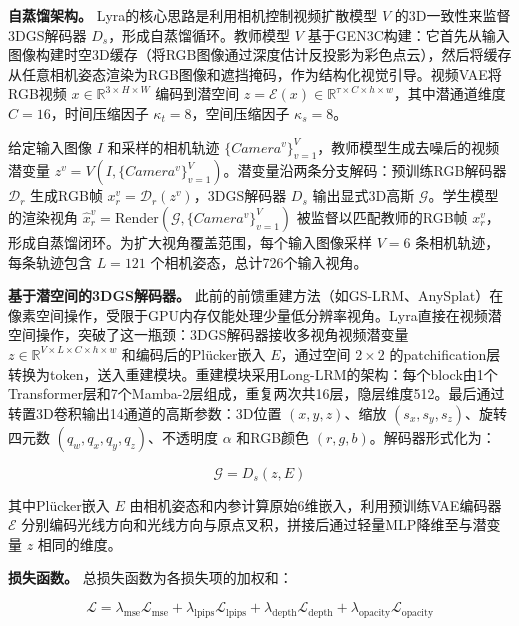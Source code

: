 \textbf{自蒸馏架构。}
Lyra的核心思路是利用相机控制视频扩散模型 $V$ 的3D一致性来监督3DGS解码器 $D_s$，形成自蒸馏循环。教师模型 $V$ 基于GEN3C构建：它首先从输入图像构建时空3D缓存（将RGB图像通过深度估计反投影为彩色点云），然后将缓存从任意相机姿态渲染为RGB图像和遮挡掩码，作为结构化视觉引导。视频VAE将RGB视频 $x \in \mathbb{R}^{3 \times H \times W}$ 编码到潜空间 $z = \mathcal{E}(x) \in \mathbb{R}^{\tau \times C \times h \times w}$，其中潜通道维度 $C=16$，时间压缩因子 $\kappa_t=8$，空间压缩因子 $\kappa_s=8$。

给定输入图像 $I$ 和采样的相机轨迹 $\{Camera^{v}\}_{v=1}^{V}$，教师模型生成去噪后的视频潜变量 $z^v = V(I, \{Camera^{v}\}_{v=1}^{V})$。潜变量沿两条分支解码：预训练RGB解码器 $\mathcal{D}_r$ 生成RGB帧 $x^v_r = \mathcal{D}_r(z^v)$，3DGS解码器 $D_s$ 输出显式3D高斯 $\mathcal{G}$。学生模型的渲染视角 $\hat{x}^v_r = \text{Render}(\mathcal{G}, \{Camera^{v}\}_{v=1}^{V})$ 被监督以匹配教师的RGB帧 $x^v_r$，形成自蒸馏闭环。为扩大视角覆盖范围，每个输入图像采样 $V=6$ 条相机轨迹，每条轨迹包含 $L=121$ 个相机姿态，总计726个输入视角。

\textbf{基于潜空间的3DGS解码器。}
此前的前馈重建方法（如GS-LRM、AnySplat）在像素空间操作，受限于GPU内存仅能处理少量低分辨率视角。Lyra直接在视频潜空间操作，突破了这一瓶颈：3DGS解码器接收多视角视频潜变量 $z \in \mathbb{R}^{V \times L \times C \times h \times w}$ 和编码后的Pl\"ucker嵌入 $E$，通过空间 $2 \times 2$ 的patchification层转换为token，送入重建模块。重建模块采用Long-LRM的架构：每个block由1个Transformer层和7个Mamba-2层组成，重复两次共16层，隐层维度512。最后通过转置3D卷积输出14通道的高斯参数：3D位置 $(x,y,z)$、缩放 $(s_x,s_y,s_z)$、旋转四元数 $(q_w,q_x,q_y,q_z)$、不透明度 $\alpha$ 和RGB颜色 $(r,g,b)$。解码器形式化为：

\begin{equation}
    \mathcal{G} = D_s(z, E)
\end{equation}

其中Pl\"ucker嵌入 $E$ 由相机姿态和内参计算原始6维嵌入，利用预训练VAE编码器 $\mathcal{E}$ 分别编码光线方向和光线方向与原点叉积，拼接后通过轻量MLP降维至与潜变量 $z$ 相同的维度。

\textbf{损失函数。}
总损失函数为各损失项的加权和：

\begin{equation}
    \mathcal{L} = \lambda_{\text{mse}} \mathcal{L}_{\text{mse}} + \lambda_{\text{lpips}} \mathcal{L}_{\text{lpips}} + \lambda_{\text{depth}} \mathcal{L}_{\text{depth}} + \lambda_{\text{opacity}} \mathcal{L}_{\text{opacity}}
\end{equation}

